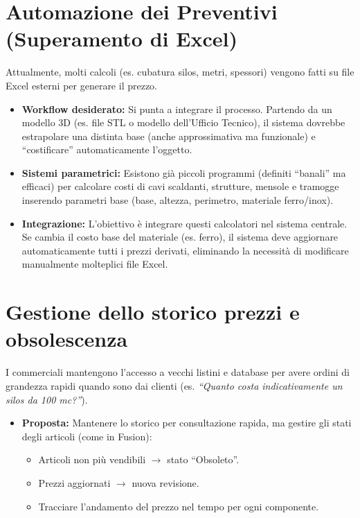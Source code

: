 \documentclass[12pt, a4paper]{article} %
\begin{document}
\section{Automazione dei Preventivi (Superamento di Excel)}
Attualmente, molti calcoli (es. cubatura silos, metri, spessori) vengono fatti su file Excel esterni per generare il prezzo.

\begin{itemize}
    \item \textbf{Workflow desiderato:} Si punta a integrare il processo. Partendo da un modello 3D (es. file STL o modello dell'Ufficio Tecnico), il sistema dovrebbe estrapolare una distinta base (anche approssimativa ma funzionale) e ``costificare'' automaticamente l'oggetto.
    \item \textbf{Sistemi parametrici:} Esistono già piccoli programmi (definiti ``banali'' ma efficaci) per calcolare costi di cavi scaldanti, strutture, mensole e tramogge inserendo parametri base (base, altezza, perimetro, materiale ferro/inox).
    \item \textbf{Integrazione:} L'obiettivo è integrare questi calcolatori nel sistema centrale. Se cambia il costo base del materiale (es. ferro), il sistema deve aggiornare automaticamente tutti i prezzi derivati, eliminando la necessità di modificare manualmente molteplici file Excel.
\end{itemize}

\section{Gestione dello storico prezzi e obsolescenza}
I commerciali mantengono l'accesso a vecchi listini e database per avere ordini di grandezza rapidi quando sono dai clienti (es. \textit{``Quanto costa indicativamente un silos da 100 mc?''}).

\begin{itemize}
    \item \textbf{Proposta:} Mantenere lo storico per consultazione rapida, ma gestire gli stati degli articoli (come in Fusion):
    \begin{itemize}
        \item Articoli non più vendibili $\rightarrow$ stato ``Obsoleto''.
        \item Prezzi aggiornati $\rightarrow$ nuova revisione.
        \item Tracciare l'andamento del prezzo nel tempo per ogni componente.
    \end{itemize}
\end{itemize}
\end{document}
